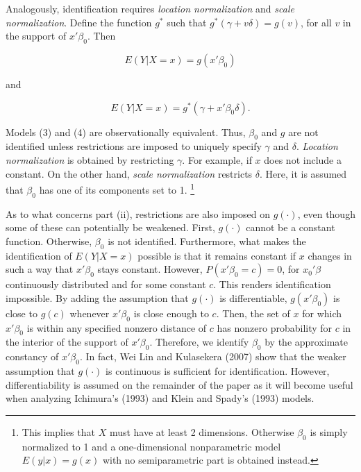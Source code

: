 \documentclass[a4paper]{article}
\begin{document}
Analogously, identification requires \textit{location normalization} and \textit{scale normalization}. Define the function $g^{*}$ such that $g^{*}(\gamma + v\delta) = g(v)$, for all $v$ in the support of $x'\beta_0$. Then

\begin{equation}
E(Y|X = x) = g(x'\beta_0)
\end{equation}

and

\begin{equation}
E(Y|X = x) = g^*(\gamma + x'\beta_0\delta).
\end{equation}

Models (3) and (4) are observationally equivalent. Thus, $\beta_0$ and $g$ are not identified unless restrictions are imposed to uniquely specify $\gamma$ and $\delta$. \textit{Location normalization} is obtained by restricting $\gamma$. For example, if $x$ does not include a constant. On the other hand, \textit{scale normalization} restricts $\delta$. Here, it is assumed that $\beta_0$ has one of its components set to 1. \footnote{This implies that $X$ must have at least 2 dimensions. Otherwise $\beta_0$ is simply normalized to 1 and a one-dimensional nonparametric model $E(y|x) = g(x)$ with no semiparametric part is obtained instead.}

As to what concerns part (ii), restrictions are also imposed on $g(\cdot)$, even though some of these can potentially be weakened. First, $g(\cdot)$ cannot be a constant function. Otherwise, $\beta_0$ is not identified. Furthermore, what makes the identification of $E(Y|X = x)$ possible is that it remains constant if $x$ changes in such a way that $x'\beta_0$ stays constant. However, $P(x'\beta_0 = c)=0$, for $x_0'\beta$ continuously distributed and for some constant $c$. This renders identification impossible. By adding the assumption that $g(\cdot)$ is differentiable, $g(x'\beta_0)$ is close to $g(c)$ whenever $x'\beta_0$ is close enough to $c$. Then, the set of $x$ for which $x'\beta_0$ is within any specified nonzero distance of $c$ has nonzero probability for $c$ in the interior of the support of $x'\beta_0$. Therefore, we identify $\beta_0$ by the approximate constancy of $x'\beta_0$. In fact, Wei Lin and Kulasekera (2007) show that the weaker assumption that $g(\cdot)$ is continuous is sufficient for identification. However, differentiability is assumed on the remainder of the paper as it will become useful when analyzing Ichimura's (1993) and Klein and Spady's (1993) models.
\end{document}
